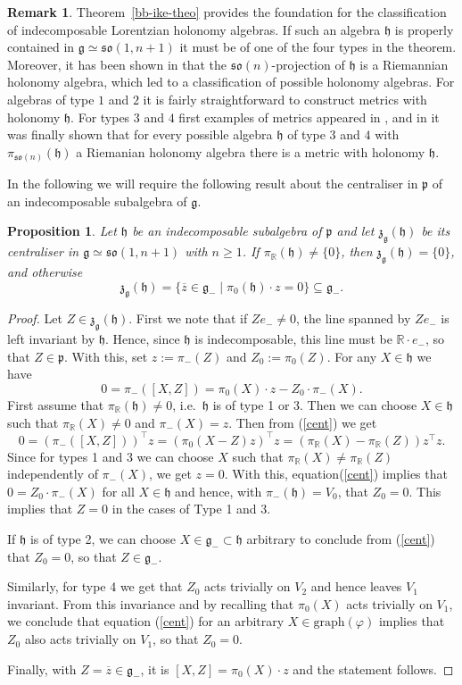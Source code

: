 \documentclass[11pt,a4paper]{amsart}
\newcommand{\vf}{\varphi}
\newcommand{\p}{\mathfrak{p}}
\newcommand{\g}{\mathfrak{g}}
\newcommand{\h}{\mathfrak{h}}
\newcommand{\z}{\mathfrak{z}}
\newcommand{\+}{\oplus}
\newcommand{\so}{\mathfrak{so}}
\newcommand{\1}{\mathbf{1}}
\newcommand{\R}{\mathbb{R}} %
\newcommand{\<}{\langle}
\renewcommand{\>}{\rangle}
\theoremstyle{definition}
\newtheorem{remark}[definition]{Remark}
\theoremstyle{plain}
\newtheorem{proposition}[definition]{Proposition}
\numberwithin{equation}{section}
\begin{document}
\begin{remark}
Theorem~\ref{bb-ike-theo} provides the foundation for the classification of indecomposable Lorentzian holonomy algebras. If such an algebra $\h$ is properly contained in $\g\simeq \so(1,n+1)$ it must be of one of the four types in the theorem. Moreover, it has been shown in \cite{leistnerjdg} that the $\so(n)$-projection of $\h$ is a Riemannian holonomy algebra, which led to a classification of possible holonomy algebras.
 For algebras of type $1$ and $2$ it is fairly straightforward to construct metrics with holonomy $\h$. For types $3$ and $4$ first examples of metrics appeared in  \cite{bb-ike93}, and in   \cite{galaev05} it was finally  shown that for every possible algebra $\h$ of type $3$ and $4$ with $\pi_{\so(n)}(\h)$ a Riemanian holonomy algebra there is a metric with holonomy $\h$. 
 \end{remark}
 


In the following we will require the following result about the centraliser in $\p$ of an indecomposable subalgebra of $\g$.
\begin{proposition}\label{centprop}
Let $\h$ be an indecomposable subalgebra of $\p$ and let $\z_\g(\h)$ be its centraliser in $\g\simeq \so(1,n+1)$ with $n\ge 1$. If $\pi_\R(\h)\not=\{0\}$,
then $
 \z_\g(\h)=\{0\}$, and otherwise \[\z_\g(\h) =\{\overline{z}\in\g_-\mid \pi_0(\h)\cdot z=0\}\subseteq \g_-.\]
 \end{proposition}
\begin{proof}
Let $Z\in \z_\g(\h)$. First  we note that if $Ze_-\not=0$, the line spanned by $Ze_-$ is left invariant by $\h$. Hence, since $\h$ is indecomposable, this line must be $\R\cdot e_-$, so that $Z\in \p$. With this, set $z:=\pi_-(Z)$ and $Z_0:=\pi_0(Z)$. For any $X\in \h$ we have 
\begin{equation}\label{cent}
0= \pi_-([X,Z]) =\pi_0(X)\cdot z - Z_0\cdot\pi_-(X).
\end{equation}
First assume that $\pi_\R(\h)\not=0$, i.e.~$\h$ is of type 1 or 3. Then we can choose $X\in \h$ such that $\pi_\R(X)\not=0$ and $\pi_-(X)=z$. Then from (\ref{cent}) we get
\[
0=(\pi_-([X,Z]))^\top z=(\pi_0(X-Z)z)^\top z =(\pi_\R(X)-\pi_\R(Z) ) z^\top z.
\]
Since for types 1 and 3 we can choose $X$ such that $\pi_\R(X)\not=\pi_\R(Z)$ independently of $\pi_-(X)$, we get $z=0$. With this, equation(\ref{cent}) implies that $0=Z_0\cdot\pi_-(X)$ for all $X\in \h$ and hence, with $\pi_-(\h)=V_0$, that $Z_0=0$. This implies  that $Z=0$ in the cases of Type 1 and 3.

If $\h$ is of type 2, we can choose $X\in \g_-\subset \h$ arbitrary to conclude from (\ref{cent}) that $Z_0=0$, so that $Z\in \g_-$.

Similarly, for type 4 we get that $Z_0$ acts trivially on $V_2$ and hence leaves $V_1$ invariant. From this  invariance and by recalling that  $\pi_0(X)$ acts trivially on $V_1$, we conclude that equation (\ref{cent}) for an arbitrary $X\in \mathrm{graph}(\vf)$ implies that $Z_0$ also acts trivially on $V_1$, so that $Z_0=0$.

Finally, with $Z=\overline{z}\in \g_-$, it is $[X,Z]=\pi_0(X)\cdot z$ and the statement follows.
\end{proof}
\end{document}
